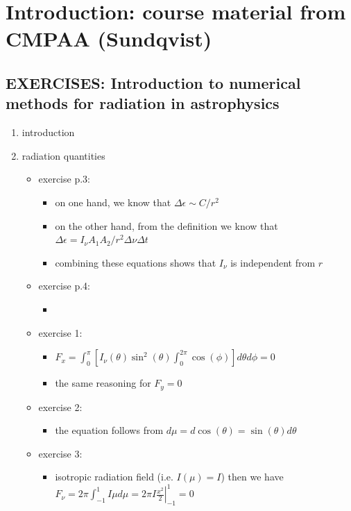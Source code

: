 \documentclass[../main/main.tex]{subfiles}
\begin{document}
\section{Introduction: course material from CMPAA (Sundqvist)}

\subsection{EXERCISES: Introduction to numerical methods for radiation in astrophysics}
\begin{enumerate}
\item introduction
\item radiation quantities
\begin{itemize}

\item exercise p.3: 
\begin{itemize}
\item on one hand, we know that $\Delta \epsilon \sim C/r^2 $
\item on the other hand, from the definition we know  that $\Delta \epsilon = I_{\nu} A_1 A_2/r^2 \Delta \nu \Delta t$
\item combining these equations shows that $I_{\nu}$ is independent from $r$
\end{itemize}

\item exercise p.4:
\begin{itemize}
\item 
\end{itemize}

\item exercise 1:
\begin{itemize}
\item $F_x =  \int_0^{\pi} \left[ I_{\nu}(\theta)\sin^2(\theta) \int_0^{2 \pi}\cos(\phi) \right] d\theta d \phi = 0 $
\item the same reasoning for $F_y = 0$
\end{itemize}

\item exercise 2:
\begin{itemize}
\item the equation follows from $d\mu = d\cos(\theta) = \sin(\theta) d\theta$
\end{itemize}

\item exercise 3: 
\begin{itemize}
\item isotropic radiation field (i.e. $I(\mu) = I$) then we have $F_{\nu} = 2 \pi  \int_{-1}^{1} I \mu d\mu = 2 \pi I \left. \frac{x^2}{2}\right \rvert_
{-1}^{1} = 0$
\end{itemize}


\end{itemize}
\end{enumerate}
\end{document}
